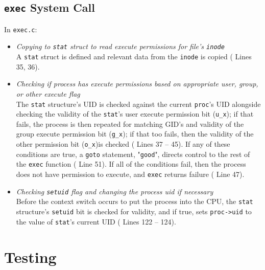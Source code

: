 \documentclass[11pt,letterpaper]{report}
\begin{document}
	\subsection{{\tt exec} System Call}
	In {\tt exec.c}:
	\begin{itemize}
		\item \emph{Copying to {\tt stat} struct to read execute permissions for file's {\tt inode}}\\
		A {\tt stat} struct is defined and relevant data from the {\tt inode} is copied ({\color{red} Lines 35, 36}).
		
		\item \emph{Checking if process has execute permissions based on appropriate user, group, or other execute flag}\\
		The {\tt stat} structure's UID is checked against the current {\tt proc}'s UID alongside checking the validity of the {\tt stat}'s user execute permission bit ({\tt u\_x}); if that fails, the process is then repeated for matching GID's and validity of the group execute permission bit ({\tt g\_x}); if that too fails, then the validity of the other permission bit ({\tt o\_x})is checked ({\color{red} Lines 37 -- 45}). If any of these conditions are true, a {\tt goto} statement, "{\tt good}", directs control to the rest of the {\tt exec} function ({\color{red} Line 51}). If all of the conditions fail, then the process does not have permission to execute, and {\tt exec} returns failure ({\color{red} Line 47}).
		
		\item \emph{Checking {\tt setuid} flag and changing the process uid if necessary}\\
		Before the context switch occurs to put the process into the CPU, the {\tt stat} structure's {\tt setuid} bit is checked for validity, and if true, sets {\tt proc->uid} to the value of {\tt stat}'s current UID ({\color{red} Lines 122 -- 124}).
		
	\end{itemize}
	
	
	
	\newpage
	\section{Testing}
	
\end{document}
